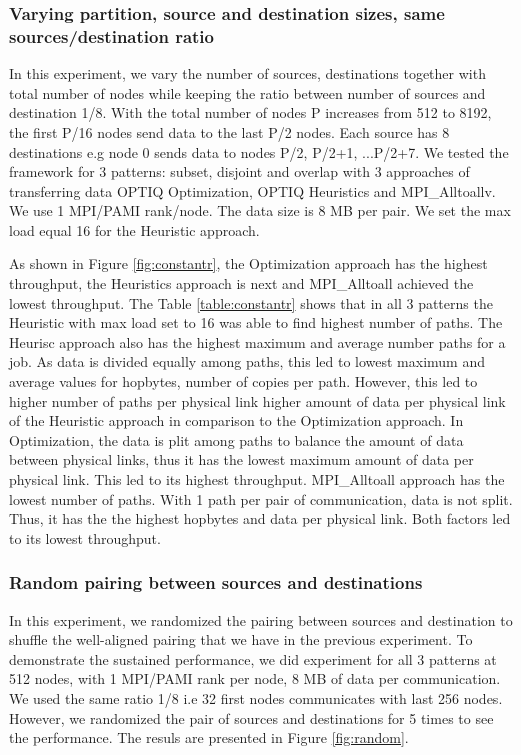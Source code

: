 \subsubsection{Varying partition, source and destination sizes, same sources/destination ratio}

In this experiment, we vary the number of sources, destinations together with total number of nodes while keeping the ratio between number of sources and destination 1/8. With the total number of nodes P  increases from 512 to 8192, the first P/16 nodes send data to the last P/2 nodes. Each source has 8 destinations e.g node 0 sends data to nodes P/2, P/2+1, ...P/2+7. We tested the framework for 3 patterns: subset, disjoint and overlap with 3 approaches of transferring data OPTIQ Optimization, OPTIQ Heuristics and MPI\_Alltoallv. We use 1 MPI/PAMI rank/node. The data size is 8 MB per pair. We set the max load equal 16 for the Heuristic approach.

As shown in Figure \ref{fig:constantr}, the Optimization approach has the highest throughput, the Heuristics approach is next and MPI\_Alltoall achieved the lowest throughput. The Table \ref{table:constantr} shows that in all 3 patterns the Heuristic with max load set to 16 was able to find highest number of paths. The Heurisc approach also has the highest maximum and average number paths for a job. As data is divided equally among paths, this led to lowest maximum and average values for hopbytes, number of copies per path. However, this led to higher number of paths per physical link higher amount of data per physical link of the Heuristic approach in comparison to the Optimization approach. In Optimization, the data is plit among paths to balance the amount of data between physical links, thus it has the lowest maximum amount of data per physical link. This led to its highest throughput. MPI\_Alltoall approach has the lowest number of paths. With 1 path per pair of communication, data is not split. Thus, it has the the highest hopbytes and data per physical link. Both factors led to its lowest throughput.

\subsubsection{Random pairing between sources and destinations}

In this experiment, we randomized the pairing between sources and destination to shuffle the well-aligned pairing that we have in the previous experiment. To demonstrate the sustained performance, we did experiment for all 3 patterns at 512 nodes, with 1 MPI/PAMI rank per node, 8 MB of data per communication. We used the same ratio 1/8 i.e 32 first nodes communicates with last 256 nodes. However, we randomized the pair of sources and destinations for 5 times to see the performance. The resuls are presented in Figure \ref{fig:random}.

